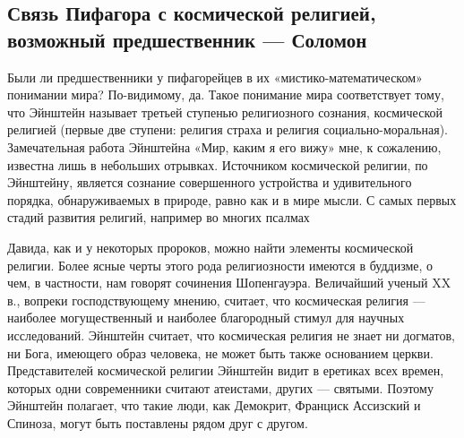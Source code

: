 \subsection{Связь   Пифагора   с   космической   религией,   возможный
предшественник --- Соломон}

Были ли  предшественники у пифагорейцев в  их «мистико-математическом»
понимании мира?  По-видимому, да.  Такое понимание  мира соответствует
тому, что  Эйнштейн называет  третьей ступенью  религиозного сознания,
космической  религией (первые  две ступени:  религия страха  и религия
социально-моральная). Замечательная работа Эйнштейна «Мир, каким я его
вижу» мне, к сожалению, известна лишь в небольших отрывках. Источником
космической  религии,  по  Эйнштейну, является  сознание  совершенного
устройства и  удивительного порядка,  обнаруживаемых в  природе, равно
как и в  мире мысли. С самых первых стадий  развития религий, например
во многих псалмах

Давида, как и  у некоторых пророков, можно  найти элементы космической
религии.  Более  ясные  черты   этого  рода  религиозности  имеются  в
буддизме,  о  чем, в  частности,  нам  говорят сочинения  Шопенгауэра.
Величайший ученый XX в.,  вопреки господствующему мнению, считает, что
космическая религия --- наиболее могущественный и наиболее благородный
стимул  для научных  исследований. Эйнштейн  считает, что  космическая
религия не  знает ни  догматов, ни Бога,  имеющего образ  человека, не
может быть также основанием церкви. Представителей космической религии
Эйнштейн  видит  в еретиках  всех  времен,  которых одни  современники
считают атеистами, других ---  святыми. Поэтому Эйнштейн полагает, что
такие люди,  как Демокрит,  Франциск Ассизский  и Спиноза,  могут быть
поставлены рядом друг с другом.

